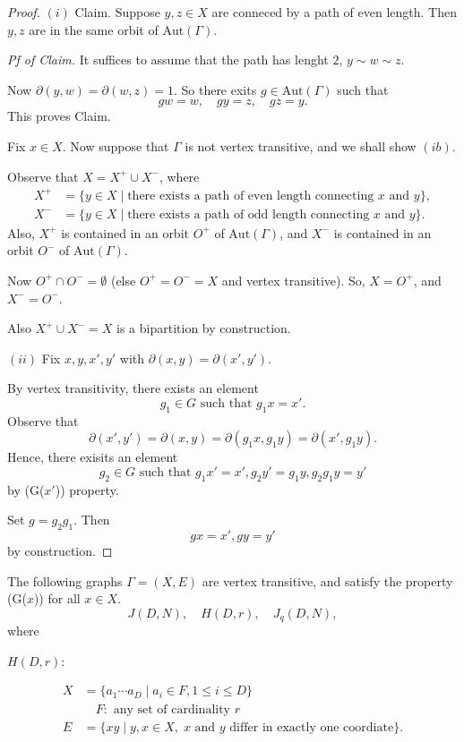 \documentclass[
]{book}
\theoremstyle{definition}
\theoremstyle{definition}
\theoremstyle{definition}
\theoremstyle{definition}
\theoremstyle{remark}
\begin{document}
\begin{proof}
\((i)\)
Claim. Suppose \(y, z\in X\) are conneced by a path of even length. Then \(y, z\) are in the same orbit of \(\mathrm{Aut}(\Gamma)\).

\emph{Pf of Claim.}
It suffices to assume that the path has lenght \(2\), \(y \sim w\sim z\).

Now \(\partial(y,w) = \partial(w,z) = 1\). So there exits \(g\in \mathrm{Aut}(\Gamma)\) such that
\[gw = w, \quad gy = z, \quad gz = y.\]
This proves Claim.

Fix \(x\in X\). Now suppose that \(\Gamma\) is not vertex transitive, and we shall show \((ib)\).

Observe that \(X = X^+ \cup X^-\), where
\begin{align}
X^+ & = \{y\in X\mid \text{there exists a path of even length connecting $x$ and $y$}\},\\
X^- & = \{y\in X\mid \text{there exists a path of odd length connecting $x$ and $y$}\}.
\end{align}
Also, \(X^+\) is contained in an orbit \(O^+\) of \(\mathrm{Aut}(\Gamma)\), and \(X^-\) is contained in an orbit \(O^-\) of \(\mathrm{Aut}(\Gamma)\).

Now \(O^+\cap O^- = \emptyset\) (else \(O^+ = O^- = X\) and vertex transitive).
So,
\(X = O^+\), and \(X^- = O^-\).

Also \(X^+ \cup X^- = X\) is a bipartition by construction.

\((ii)\) Fix \(x, y, x', y'\) with \(\partial(x,y) = \partial(x',y')\).

By vertex transitivity, there exists an element
\[g_1\in G \text{ such that } g_1x = x'.\]
Observe that
\[\partial(x', y') = \partial(x,y) = \partial(g_1x, g_1y) = \partial(x', g_1y).\]
Hence, there exisits an element
\[g_2\in G \text{ such that } g_1x' = x', g_2y' = g_1y, g_2g_1y = y'\]
by (G(\(x'\))) property.

Set \(g = g_2g_1\). Then
\[gx = x', gy = y'\]
by construction.
\end{proof}

The following graphs \(\Gamma = (X, E)\) are vertex transitive, and satisfy the property (G(\(x\))) for all \(x\in X\).
\[J(D, N), \quad H(D, r), \quad J_q(D,N),\]
where

\(H(D,r)\):

\begin{align}
X & = \{a_1\cdots a_D\mid a_i\in F, 1\leq i\leq D\}\\
& \quad F: \text{ any set of cardinality $r$}\\
E & = \{xy\mid y, x\in X, \; \text{$x$ and $y$ differ in exactly one coordiate}\}.
\end{align}
\end{document}

